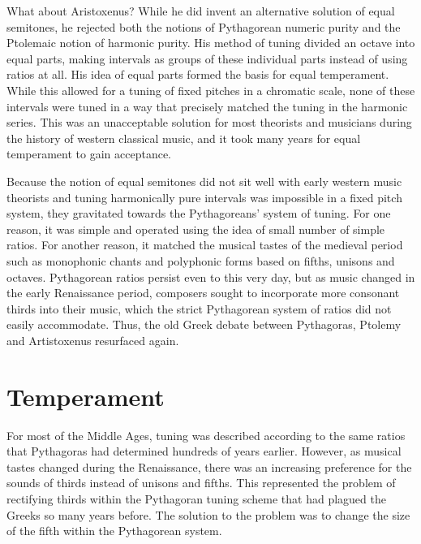 What about Aristoxenus?  While he did invent an alternative solution of equal semitones,
he rejected both the notions of Pythagorean numeric purity and the Ptolemaic notion of
harmonic purity.  His method of tuning divided an octave into equal parts, making
intervals as groups of these individual parts instead of using ratios at all.  His idea of
equal parts formed the basis for equal temperament.  While this allowed for a tuning of
fixed pitches in a chromatic scale, none of these intervals were tuned in a way that
precisely matched the tuning in the harmonic series.  This was an unacceptable solution
for most theorists and musicians during the history of western classical music, and it
took many years for equal temperament to gain acceptance.

Because the notion of equal semitones did not sit well with early western music theorists
and tuning harmonically pure intervals was impossible in a fixed pitch system, they
gravitated towards the Pythagoreans' system of tuning.  For one reason, it was simple and
operated using the idea of small number of simple ratios.  For another reason, it matched
the musical tastes of the medieval period such as monophonic chants and polyphonic forms
based on fifths, unisons and octaves.  Pythagorean ratios persist even to this very day,
but as music changed in the early Renaissance period, composers sought to incorporate more
consonant thirds into their music, which the strict Pythagorean system of ratios did not
easily accommodate.  Thus, the old Greek debate between Pythagoras, Ptolemy and
Artistoxenus resurfaced again.

\section{Temperament}

For most of the Middle Ages, tuning was described according to the same
ratios that Pythagoras had determined hundreds of years earlier. However, as
musical tastes changed during the Renaissance, there was an increasing
preference for the sounds of thirds instead of unisons and fifths. This
represented the problem of rectifying thirds within the Pythagoran tuning
scheme that had plagued the Greeks so many years before. The solution
to the problem was to change the size of the fifth within the Pythagorean
system.

